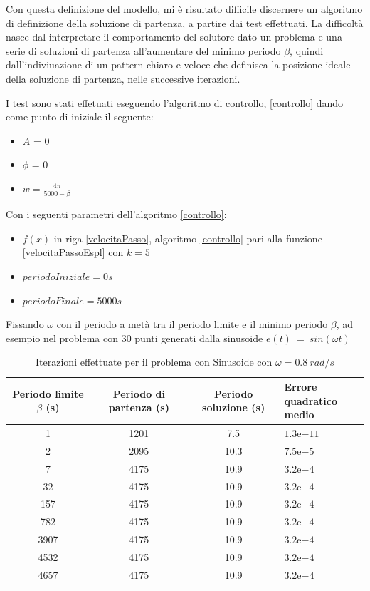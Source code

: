\documentclass[a4paper,12pt]{report}
\newcommand{\expnumber}[2]{{#1}\mathrm{e}{#2}}
\begin{document}
Con questa definizione del modello, mi è risultato difficile discernere un algoritmo di definizione della soluzione di partenza, a partire dai test effettuati. La difficoltà nasce dal interpretare il comportamento del solutore dato un problema e una serie di soluzioni di partenza all'aumentare del minimo periodo $ \beta $, quindi dall'indiviuazione di un pattern chiaro e veloce che definisca la posizione ideale della soluzione di partenza, nelle successive iterazioni.

I test sono stati effetuati eseguendo l'algoritmo di controllo, \ref{controllo} dando come punto di iniziale il seguente:
\begin{itemize}
  \item $A$ = 0
  \item $\phi$ = 0
  \item $w = \frac{4\pi}{5000 - \beta}$
\end{itemize}

Con i seguenti parametri dell'algoritmo \ref{controllo}:
\begin{itemize}
  \item $f(x)$ in riga \ref{velocitaPasso}, algoritmo \ref{controllo} pari alla funzione \eqref{velocitaPassoEspl} con $k = 5$
  \item $periodoIniziale = 0s$
  \item $periodoFinale = 5000s$
\end{itemize}

Fissando $ \omega $ con il periodo a metà tra il periodo limite e il minimo periodo $\beta$, ad esempio nel problema con 30 punti generati dalla sinusoide $ e(t)~=~sin(\omega t)$

\begin{table}[H]
  \caption{Iterazioni effettuate per il problema con Sinusoide con $\omega = 0.8~rad/s$}
  \label{tab:init_08}
  \begin{center}
    \begin{tabularx}{\textwidth}{SSSp{0.5\textwidth}}
      \toprule
      {Periodo limite $\beta$ (s)} & {Periodo di partenza (s)} & {Periodo soluzione (s)} & {Errore quadratico \newline medio} \\
       &  1201 & 7.5 & $\expnumber{1.3}{-11}$\\
      2 &  2095 & 10.3 & $\expnumber{7.5}{-5}$\\
      7 &  4175 & 10.9 & $\expnumber{3.2}{-4}$\\
      32 &  4175 & 10.9 & $\expnumber{3.2}{-4}$\\
      157 &  4175 & 10.9 & $\expnumber{3.2}{-4}$\\
      782 &  4175 & 10.9 & $\expnumber{3.2}{-4}$\\
      3907 &  4175 & 10.9 & $\expnumber{3.2}{-4}$\\
      4532 &  4175 & 10.9 & $\expnumber{3.2}{-4}$\\
      4657 &  4175 & 10.9 & $\expnumber{3.2}{-4}$\\
      \bottomrule
    \end{tabularx}
  \end{center}
\end{table}
\end{document}
